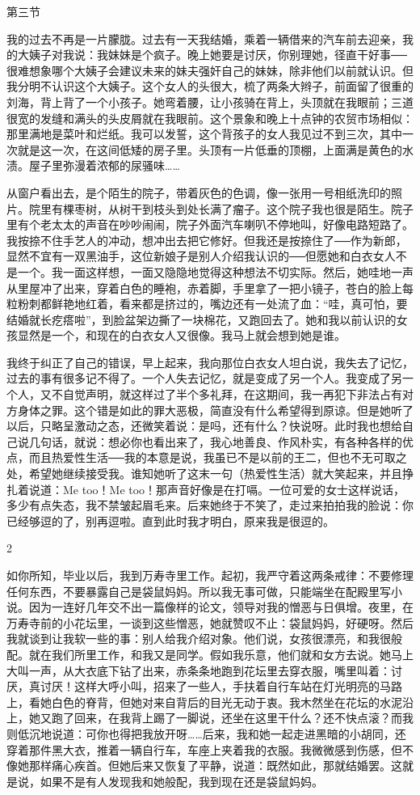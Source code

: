 第三节 

我的过去不再是一片朦胧。过去有一天我结婚，乘着一辆借来的汽车前去迎亲，我的大姨子对我说：我妹妹是个疯子。晚上她要是讨厌，你别理她，径直干好事──很难想象哪个大姨子会建议未来的妹夫强奸自己的妹妹，除非他们以前就认识。但我分明不认识这个大姨子。这个女人的头很大，梳了两条大辫子，前面留了很重的刘海，背上背了一个小孩子。她弯着腰，让小孩骑在背上，头顶就在我眼前；三道很宽的发缝和满头的头皮屑就在我眼前。这个景象和晚上十点钟的农贸市场相似：那里满地是菜叶和烂纸。我可以发誓，这个背孩子的女人我见过不到三次，其中一次就是这一次，在这间低矮的房子里。头顶有一片低垂的顶棚，上面满是黄色的水渍。屋子里弥漫着浓郁的尿骚味…… 

从窗户看出去，是个陌生的院子，带着灰色的色调，像一张用一号相纸洗印的照片。院里有棵枣树，从树干到枝头到处长满了瘤子。这个院子我也很是陌生。院子里有个老太太的声音在吵吵闹闹，院子外面汽车喇叭不停地叫，好像电路短路了。我按捺不住手艺人的冲动，想冲出去把它修好。但我还是按捺住了──作为新郎，显然不宜有一双黑油手，这位新娘子是别人介绍我认识的──但愿她和白衣女人不是一个。我一面这样想，一面又隐隐地觉得这种想法不切实际。然后，她哇地一声从里屋冲了出来，穿着白色的睡袍，赤着脚，手里拿了一把小镜子，苍白的脸上每粒粉刺都鲜艳地红着，看来都是挤过的，嘴边还有一处流了血：“哇，真可怕，要结婚就长疙瘩啦”，到脸盆架边撕了一块棉花，又跑回去了。她和我以前认识的女孩显然是一个，和现在的白衣女人又很像。我马上就会想到她是谁。 

我终于纠正了自己的错误，早上起来，我向那位白衣女人坦白说，我失去了记忆，过去的事有很多记不得了。一个人失去记忆，就是变成了另一个人。我变成了另一个人，又不自觉声明，就这样过了半个多礼拜，在这期间，我一再犯下非法占有对方身体之罪。这个错是如此的罪大恶极，简直没有什么希望得到原谅。但是她听了以后，只略呈激动之态，还微笑着说：是吗，还有什么？快说呀。此时我也想给自己说几句话，就说：想必你也看出来了，我心地善良、作风朴实，有各种各样的优点，而且热爱性生活──我的本意是说，我虽已不是以前的王二，但也不无可取之处，希望她继续接受我。谁知她听了这末一句（热爱性生活）就大笑起来，并且挣扎着说道：Me too！Me too！那声音好像是在打嗝。一位可爱的女士这样说话，多少有点失态，我不禁皱起眉毛来。后来她终于不笑了，走过来拍拍我的脸说：你已经够逗的了，别再逗啦。直到此时我才明白，原来我是很逗的。 

2 

如你所知，毕业以后，我到万寿寺里工作。起初，我严守着这两条戒律：不要修理任何东西，不要暴露自己是袋鼠妈妈。所以我无事可做，只能端坐在配殿里写小说。因为一连好几年交不出一篇像样的论文，领导对我的憎恶与日俱增。夜里，在万寿寺前的小花坛里，一谈到这些憎恶，她就赞叹不止：袋鼠妈妈，好硬呀。然后我就谈到让我软一些的事：别人给我介绍对象。他们说，女孩很漂亮，和我很般配。就在我们所里工作，和我又是同学。假如我乐意，他们就和女方去说。她马上大叫一声，从大衣底下钻了出来，赤条条地跑到花坛里去穿衣服，嘴里叫着：讨厌，真讨厌！这样大呼小叫，招来了一些人，手扶着自行车站在灯光明亮的马路上，看她白色的脊背，但她对来自背后的目光无动于衷。我木然坐在花坛的水泥沿上，她又跑了回来，在我背上踢了一脚说，还坐在这里干什么？还不快点滚？而我则低沉地说道：可你也得把我放开呀……后来，我和她一起走进黑暗的小胡同，还穿着那件黑大衣，推着一辆自行车，车座上夹着我的衣服。我微微感到伤感，但不像她那样痛心疾首。但她后来又恢复了平静，说道：既然如此，那就结婚罢。这就是说，如果不是有人发现我和她般配，我到现在还是袋鼠妈妈。 

